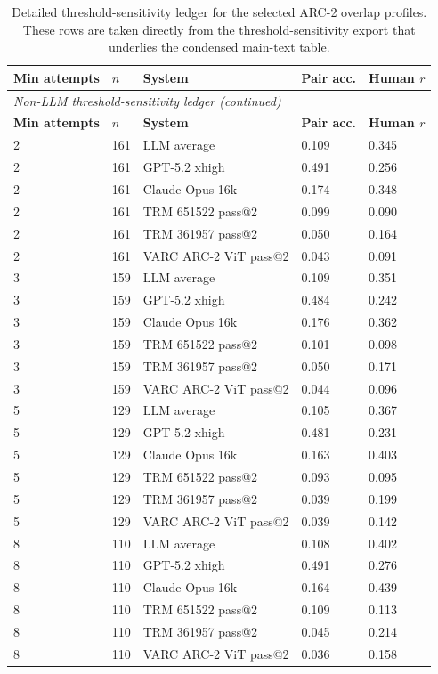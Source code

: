 \documentclass[11pt,letterpaper]{article}
\begin{document}
{\scriptsize
\begin{longtable}{p{0.5in}p{0.5in}p{2.25in}p{0.7in}p{0.7in}}
\caption{Detailed threshold-sensitivity ledger for the selected ARC-2 overlap profiles. These rows are taken directly from the threshold-sensitivity export that underlies the condensed main-text table.} \\
\toprule
\textbf{Min attempts} & \textbf{$n$} & \textbf{System} & \textbf{Pair acc.} & \textbf{Human $r$} \\
\midrule
\endfirsthead
\multicolumn{5}{l}{\small\itshape Non-LLM threshold-sensitivity ledger (continued)} \\
\toprule
\textbf{Min attempts} & \textbf{$n$} & \textbf{System} & \textbf{Pair acc.} & \textbf{Human $r$} \\
\midrule
\endhead
2 & 161 & LLM average & 0.109 & 0.345 \\
2 & 161 & GPT-5.2 xhigh & 0.491 & 0.256 \\
2 & 161 & Claude Opus 16k & 0.174 & 0.348 \\
2 & 161 & TRM 651522 pass@2 & 0.099 & 0.090 \\
2 & 161 & TRM 361957 pass@2 & 0.050 & 0.164 \\
2 & 161 & VARC ARC-2 ViT pass@2 & 0.043 & 0.091 \\
3 & 159 & LLM average & 0.109 & 0.351 \\
3 & 159 & GPT-5.2 xhigh & 0.484 & 0.242 \\
3 & 159 & Claude Opus 16k & 0.176 & 0.362 \\
3 & 159 & TRM 651522 pass@2 & 0.101 & 0.098 \\
3 & 159 & TRM 361957 pass@2 & 0.050 & 0.171 \\
3 & 159 & VARC ARC-2 ViT pass@2 & 0.044 & 0.096 \\
5 & 129 & LLM average & 0.105 & 0.367 \\
5 & 129 & GPT-5.2 xhigh & 0.481 & 0.231 \\
5 & 129 & Claude Opus 16k & 0.163 & 0.403 \\
5 & 129 & TRM 651522 pass@2 & 0.093 & 0.095 \\
5 & 129 & TRM 361957 pass@2 & 0.039 & 0.199 \\
5 & 129 & VARC ARC-2 ViT pass@2 & 0.039 & 0.142 \\
8 & 110 & LLM average & 0.108 & 0.402 \\
8 & 110 & GPT-5.2 xhigh & 0.491 & 0.276 \\
8 & 110 & Claude Opus 16k & 0.164 & 0.439 \\
8 & 110 & TRM 651522 pass@2 & 0.109 & 0.113 \\
8 & 110 & TRM 361957 pass@2 & 0.045 & 0.214 \\
8 & 110 & VARC ARC-2 ViT pass@2 & 0.036 & 0.158 \\
\bottomrule
\end{longtable}
}
\end{document}
